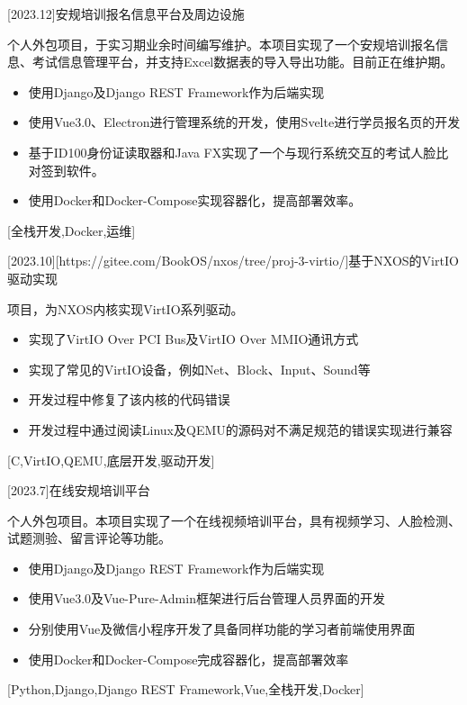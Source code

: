 \documentclass[zh]{resume}
\begin{document}
\begin {projects}
	[2023.12]{安规培训报名信息平台及周边设施}{
		个人外包项目，于实习期业余时间编写维护。本项目实现了一个安规培训报名信息、考试信息管理平台，并支持Excel数据表的导入导出功能。目前正在维护期。
		\begin{itemize}
			\item 使用Django及Django REST Framework作为后端实现
			\item 使用Vue3.0、Electron进行管理系统的开发，使用Svelte进行学员报名页的开发
			\item 基于ID100身份证读取器和Java FX实现了一个与现行系统交互的考试人脸比对签到软件。
			\item 使用Docker和Docker-Compose实现容器化，提高部署效率。
		\end{itemize}
	}[全栈开发,Docker,运维]

	[2023.10][https://gitee.com/BookOS/nxos/tree/proj-3-virtio/]{基于NXOS的VirtIO驱动实现}{
		项目，为NXOS内核实现VirtIO系列驱动。
		\begin{itemize}
			\item 实现了VirtIO Over PCI Bus及VirtIO Over MMIO通讯方式
			\item 实现了常见的VirtIO设备，例如Net、Block、Input、Sound等
			\item 开发过程中修复了该内核的代码错误
			\item 开发过程中通过阅读Linux及QEMU的源码对不满足规范的错误实现进行兼容
		\end{itemize}
	}[C,VirtIO,QEMU,底层开发,驱动开发]

	[2023.7]{在线安规培训平台}{
		个人外包项目。本项目实现了一个在线视频培训平台，具有视频学习、人脸检测、试题测验、留言评论等功能。
		\begin{itemize}
			\item 使用Django及Django REST Framework作为后端实现
			\item 使用Vue3.0及Vue-Pure-Admin框架进行后台管理人员界面的开发
			\item 分别使用Vue及微信小程序开发了具备同样功能的学习者前端使用界面
			\item 使用Docker和Docker-Compose完成容器化，提高部署效率
		\end{itemize}
	}[Python,Django,Django REST Framework,Vue,全栈开发,Docker]


\end{projects}
\end{document}
